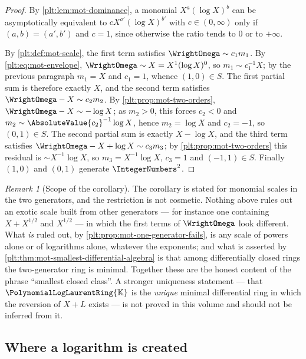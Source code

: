 \documentclass[11pt,oneside]{article}
\theoremstyle{plain}
\theoremstyle{definition}
\theoremstyle{remark}
\newtheorem{remark}[theorem]{Remark}
\newcommand{\K}{\mathbb{K}}
\newcommand{\PLlau}{\PolynomialLogLaurentRing{\K}}       %
\begin{document}
\begin{proof}
By \cref{plt:lem:mot-dominance}, a monomial \(X^{a}(\log X)^{b}\) can be
asymptotically equivalent to \(cX^{a'}(\log X)^{b'}\) with \(c\in(0,\infty)\)
only if \((a,b)=(a',b')\) and \(c=1\), since otherwise the ratio tends to
\(0\) or to \(+\infty\).

By \cref{plt:def:mot-scale}, the first term satisfies
\(\WrightOmega\sim c_{1}m_{1}\).  By \eqref{plt:eq:mot-envelope},
\(\WrightOmega\sim X=X^{1}(\log X)^{0}\), so \(m_{1}\sim c_{1}^{-1}X\); by the
previous paragraph \(m_{1}=X\) and \(c_{1}=1\), whence \((1,0)\in S\).  The
first partial sum is therefore exactly \(X\), and the second term satisfies
\(\WrightOmega-X\sim c_{2}m_{2}\).  By \cref{plt:prop:mot-two-orders},
\(\WrightOmega-X\sim-\log X\); as \(m_{2}>0\), this forces \(c_{2}<0\) and
\(m_{2}\sim\AbsoluteValue{c_{2}}^{-1}\log X\), hence \(m_{2}=\log X\) and
\(c_{2}=-1\), so \((0,1)\in S\).  The second partial sum is exactly
\(X-\log X\), and the third term satisfies
\(\WrightOmega-X+\log X\sim c_{3}m_{3}\); by
\cref{plt:prop:mot-two-orders} this residual is \(\sim X^{-1}\log X\), so
\(m_{3}=X^{-1}\log X\), \(c_{3}=1\) and \((-1,1)\in S\).  Finally \((1,0)\) and
\((0,1)\) generate \(\IntegerNumbers^{2}\).
\end{proof}

\begin{remark}[Scope of the corollary]
\label{plt:rmk:mot-corollary-scope}
The corollary is stated for monomial scales in the two generators, and the
restriction is not cosmetic.  Nothing above rules out an exotic scale built
from other generators --- for instance one containing \(X+X^{1/2}\) and
\(X^{1/2}\) --- in which the first terms of \(\WrightOmega\) look different.
What \emph{is} ruled out, by \cref{plt:prop:mot-one-generator-fails}, is any
scale of powers alone or of logarithms alone, whatever the exponents; and what
is asserted by \cref{plt:thm:mot-smallest-differential-algebra} is that among
differentially closed rings the two-generator ring is minimal.  Together these
are the honest content of the phrase ``smallest closed class''.  A stronger
uniqueness statement --- that \(\PLlau\) is the \emph{unique} minimal
differential ring in which the reversion of \(X+L\) exists --- is not proved in
this volume and should not be inferred from it.
\end{remark}

\subsection{Where a logarithm is created}
\label{plt:sec:mot-creation}
\end{document}
